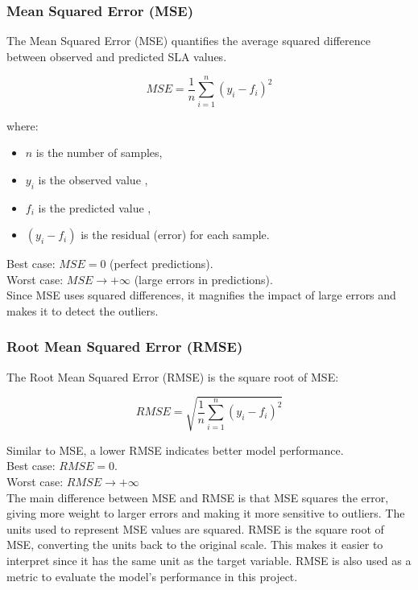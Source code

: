 \documentclass[12pt,a4paper]{report}
\begin{document}
\subsubsection*{Mean Squared Error (MSE)}
The Mean Squared Error (MSE) quantifies the average squared difference between observed and predicted SLA values.

\begin{equation}
    MSE = \frac{1}{n} \sum_{i=1}^{n} (y_i - f_i)^2
\end{equation}

where:
\begin{itemize}
    \item $n$ is the number of samples,
    \item $y_i$ is the observed value ,
    \item $f_i$ is the predicted  value ,
    \item $(y_i - f_i)$ is the residual (error) for each sample.
\end{itemize}

Best case: $MSE = 0$ (perfect predictions). \\

Worst case: $MSE \to +\infty$ (large errors in predictions). \\

Since MSE uses squared differences, it magnifies the impact of large errors and makes it to detect the outliers.

\subsubsection*{Root Mean Squared Error (RMSE)}
The Root Mean Squared Error (RMSE) is the square root of MSE:

\begin{equation}
    RMSE = \sqrt{\frac{1}{n} \sum_{i=1}^{n} (y_i - f_i)^2}
\end{equation}

Similar to MSE, a lower RMSE indicates better model performance. \\

Best case: $RMSE = 0$. \\
Worst case: $RMSE \to +\infty$ \\ 

The main difference between MSE and RMSE is that MSE squares the error, giving more weight to larger errors and making it more sensitive to outliers. The units used to represent MSE values are squared. RMSE is the square root of MSE, converting the units back to the original scale. This makes it easier to interpret since it has the same unit as the target variable. RMSE is also used as a metric to evaluate the model's performance in this project.
\end{document}
